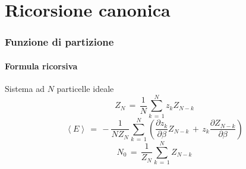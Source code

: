 \section{Ricorsione canonica}


\begin{frame}
  \frametitle{Funzione di partizione}
  \framesubtitle{Formula ricorsiva}
  
    \centering
    Sistema ad $N$ particelle ideale
    \vspace{6pt}
    $$
        Z_N\,=\,\frac{1}{N}\sum_{k\,=\,1}^{N} z_kZ_{N-k}
    $$
    $$
        \left<E\right>\,=\,-\frac{1}{NZ_N}\sum_{k\,=\,1}^N\left(\frac{\partial z_k}{\partial \beta}Z_{N-k}\,+\,z_k\frac{\partial Z_{N-k}}{\partial \beta}\right)
    $$
    $$
        N_0\,=\,\frac{1}{Z_N}\sum_{k\,=\,1}^{N} Z_{N-k}
    $$


\end{frame}
